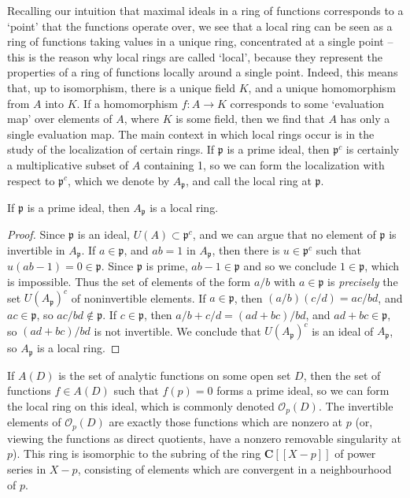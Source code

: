 Recalling our intuition that maximal ideals in a ring of functions corresponds to a `point' that the functions operate over, we see that a local ring can be seen as a ring of functions taking values in a unique ring, concentrated at a single point -- this is the reason why local rings are called `local', because they represent the properties of a ring of functions locally around a single point. Indeed, this means that, up to isomorphism, there is a unique field $K$, and a unique homomorphism from $A$ into $K$. If a homomorphism $f: A \to K$ corresponds to some `evaluation map' over elements of $A$, where $K$ is some field, then we find that $A$ has only a single evaluation map. The main context in which local rings occur is in the study of the localization of certain rings. If $\mathfrak{p}$ is a prime ideal, then $\mathfrak{p}^c$ is certainly a multiplicative subset of $A$ containing 1, so we can form the localization with respect to $\mathfrak{p}^c$, which we denote by $A_{\mathfrak{p}}$, and call the local ring at $\mathfrak{p}$.

\begin{theorem}
    If $\mathfrak{p}$ is a prime ideal, then $A_{\mathfrak{p}}$ is a local ring.
\end{theorem}
\begin{proof}
    Since $\mathfrak{p}$ is an ideal, $U(A) \subset \mathfrak{p}^c$, and we can argue that no element of $\mathfrak{p}$ is invertible in $A_{\mathfrak{p}}$. If $a \in \mathfrak{p}$, and $ab = 1$ in $A_{\mathfrak{p}}$, then there is $u \in \mathfrak{p}^c$ such that $u(ab - 1) = 0 \in \mathfrak{p}$. Since $\mathfrak{p}$ is prime, $ab - 1 \in \mathfrak{p}$ and so we conclude $1 \in \mathfrak{p}$, which is impossible. Thus the set of elements of the form $a/b$ with $a \in \mathfrak{p}$ is {\it precisely} the set $U(A_{\mathfrak{p}})^c$ of noninvertible elements. If $a \in \mathfrak{p}$, then $(a/b)(c/d) = ac/bd$, and $ac \in \mathfrak{p}$, so $ac/bd \not \in \mathfrak{p}$. If $c \in \mathfrak{p}$, then $a/b + c/d = (ad + bc)/bd$, and $ad + bc \in \mathfrak{p}$, so $(ad + bc)/bd$ is not invertible. We conclude that $U(A_{\mathfrak{p}})^c$ is an ideal of $A_{\mathfrak{p}}$, so $A_{\mathfrak{p}}$ is a local ring.
\end{proof}

\begin{example}
    If $A(D)$ is the set of analytic functions on some open set $D$, then the set of functions $f \in A(D)$ such that $f(p) = 0$ forms a prime ideal, so we can form the local ring on this ideal, which is commonly denoted $\mathcal{O}_p(D)$. The invertible elements of $\mathcal{O}_p(D)$ are exactly those functions which are nonzero at $p$ (or, viewing the functions as direct quotients, have a nonzero removable singularity at $p$). This ring is isomorphic to the subring of the ring $\mathbf{C}[[X-p]]$ of power series in $X-p$, consisting of elements which are convergent in a neighbourhood of $p$.
\end{example}

